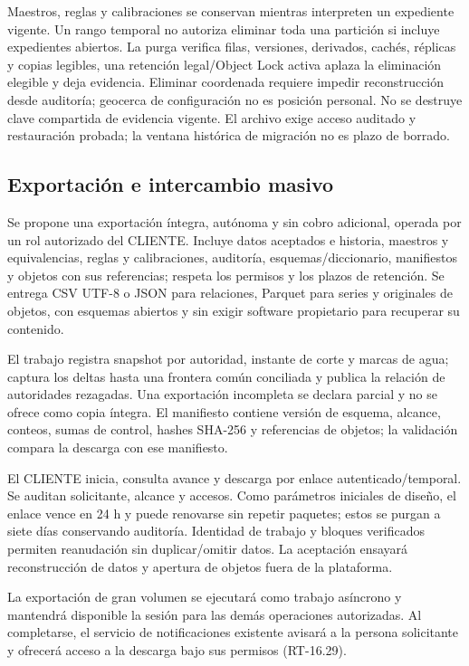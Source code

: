 Maestros, reglas y calibraciones se conservan mientras interpreten un expediente vigente. Un rango temporal no autoriza eliminar toda una partición si incluye expedientes abiertos. La purga verifica filas, versiones, derivados, cachés, réplicas y copias legibles, una retención legal/Object Lock activa aplaza la eliminación elegible y deja evidencia. Eliminar coordenada requiere impedir reconstrucción desde auditoría; geocerca de configuración no es posición personal. No se destruye clave compartida de evidencia vigente. El archivo exige acceso auditado y restauración probada; la ventana histórica de migración no es plazo de borrado.

\subsection{Exportación e intercambio masivo}
\label{sec:sd5-5-2-8}

Se propone una exportación íntegra, autónoma y sin cobro adicional, operada por un rol autorizado del CLIENTE. Incluye datos aceptados e historia, maestros y equivalencias, reglas y calibraciones, auditoría, esquemas/diccionario, manifiestos y objetos con sus referencias; respeta los permisos y los plazos de retención. Se entrega CSV UTF-8 o JSON para relaciones, Parquet para series y originales de objetos, con esquemas abiertos y sin exigir software propietario para recuperar su contenido.

El trabajo registra snapshot por autoridad, instante de corte y marcas de agua; captura los deltas hasta una frontera común conciliada y publica la relación de autoridades rezagadas. Una exportación incompleta se declara parcial y no se ofrece como copia íntegra. El manifiesto contiene versión de esquema, alcance, conteos, sumas de control, hashes SHA-256 y referencias de objetos; la validación compara la descarga con ese manifiesto.

El CLIENTE inicia, consulta avance y descarga por enlace autenticado/temporal. Se auditan solicitante, alcance y accesos. Como parámetros iniciales de diseño, el enlace vence en 24 h y puede renovarse sin repetir paquetes; estos se purgan a siete días conservando auditoría. Identidad de trabajo y bloques verificados permiten reanudación sin duplicar/omitir datos. La aceptación ensayará reconstrucción de datos y apertura de objetos fuera de la plataforma.

La exportación de gran volumen se ejecutará como trabajo asíncrono y mantendrá disponible la sesión para las demás operaciones autorizadas. Al completarse, el servicio de notificaciones existente avisará a la persona solicitante y ofrecerá acceso a la descarga bajo sus permisos (RT-16.29).

